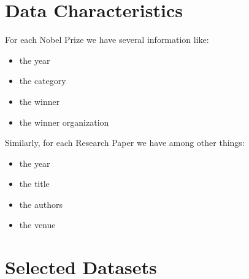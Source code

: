 \documentclass{article}
\begin{document}
\section*{Data Characteristics}
For each Nobel Prize we have several information like:
\begin{itemize}
	\item the year
	\item the category
	\item the winner
	\item the winner organization
\end{itemize}
Similarly, for each Research Paper we have among other things:
\begin{itemize}
	\item the year
	\item the title
	\item the authors
	\item the venue
\end{itemize}



\section*{Selected Datasets}
\end{document}
